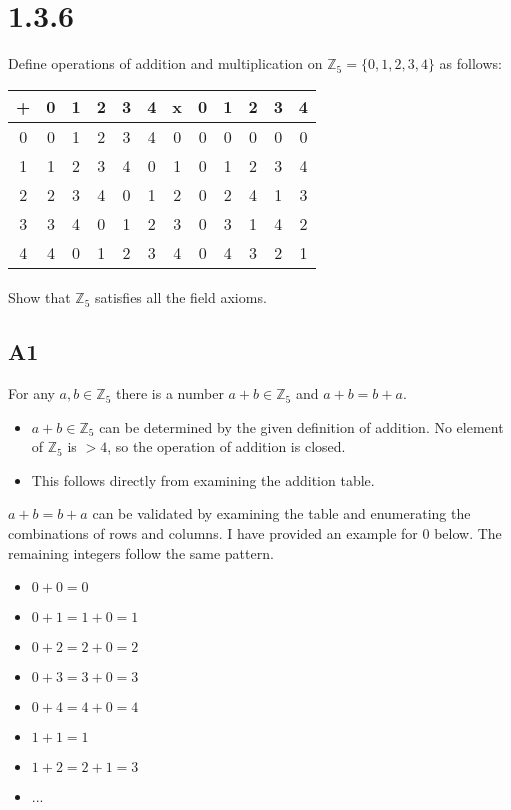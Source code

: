 \documentclass{article}
\begin{document}
\section{1.3.6}

Define operations of addition and multiplication on $\mathbb{Z}_5 = \{0,1,2,3,4\}$ as follows:

\begin{tabular}{|c|c|c|c|c|c||c|c|c|c|c|c|}
    \hline
    + & 0 & 1 & 2 & 3 & 4 & x & 0 & 1 & 2 & 3 & 4 \\
    \hline
    0 & 0 & 1 & 2 & 3 & 4 & 0 & 0 & 0 & 0 & 0 & 0 \\
    \hline
    1 & 1 & 2 & 3 & 4 & 0 & 1 & 0 & 1 & 2 & 3 & 4 \\
    \hline
    2 & 2 & 3 & 4 & 0 & 1 & 2 & 0 & 2 & 4 & 1 & 3 \\
    \hline
    3 & 3 & 4 & 0 & 1 & 2 & 3 & 0 & 3 & 1 & 4 & 2 \\
    \hline
    4 & 4 & 0 & 1 & 2 & 3 & 4 & 0 & 4 & 3 & 2 & 1 \\
    \hline
\end{tabular}

\paragraph{}

Show that $\mathbb{Z}_5$ satisfies all the field axioms.

\subsection{A1}

For any $a, b\in\mathbb{Z}_5$ there is a number $a+b\in\mathbb{Z}_5$ and $a + b = b + a$.

\begin{itemize}
    \item $a+b\in\mathbb{Z}_5$ can be determined by the given definition of addition.  No element of $\mathbb{Z}_5$ is $>4$, so the operation of addition is closed.
    \item This follows directly from examining the addition table.
\end{itemize}

$a + b = b + a$ can be validated by examining the table and enumerating the combinations of rows and columns.  I have provided an example for $0$ below.  The remaining integers follow the same pattern.
\begin{itemize}
	\item $0+0=0$
	\item $0+1=1+0=1$
	\item $0+2=2+0=2$
	\item $0+3=3+0=3$
	\item $0+4=4+0=4$
	\item $1+1=1$
	\item $1+2=2+1=3$
	\item ...
\end{itemize}
\end{document}
